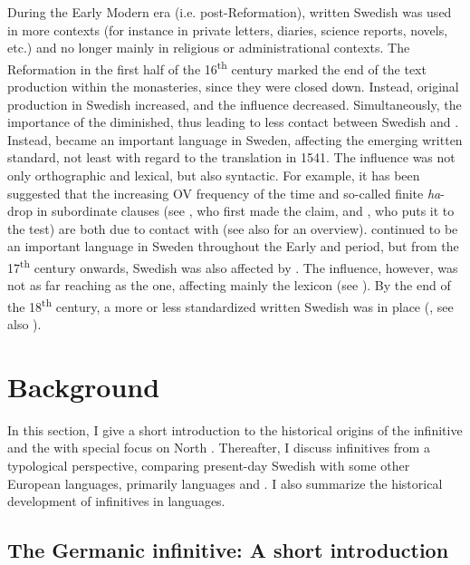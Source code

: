 \documentclass[output=paper]{langscibook}
\begin{document}
During the Early Modern era (i.e. post-Reformation), written Swedish was used in more contexts (for instance in private letters, diaries, science reports, novels, etc.) and no longer mainly in religious or administrational contexts. The Reformation in the first half of the 16\textsuperscript{th} century marked the end of the text production within the monasteries, since they were closed down. Instead, original production in Swedish increased, and the  influence decreased. Simultaneously, the importance of the  diminished, thus leading to less contact between Swedish and . Instead,  became an important language in Sweden, affecting the emerging written standard, not least with regard to the  translation in 1541. The  influence was not only orthographic and lexical, but also syntactic. For example, it has been suggested that the increasing OV frequency of the time \citep{Petzell2011} and so-called finite \textit{ha}{}-drop in subordinate clauses (see \citealt{Johannisson1945}, who first made the claim, and \citealt{Backstrom2019}, who puts it to the test) are both due to contact with  (see also \citealt{Braunmuller2005} for an overview).  continued to be an important language in Sweden throughout the Early and  period, but from the 17\textsuperscript{th} century onwards, Swedish was also affected by . The  influence, however, was not as far reaching as the  one, affecting mainly the lexicon (see \citealt{Gellerstam2005}). By the end of the 18\textsuperscript{th} century, a more or less standardized written Swedish was in place (\citealt{Teleman2002}, see also ).


\section{Background}\label{sec:kalm:3}


In this section, I give a short introduction to the historical origins of the infinitive and the  with special focus on North . Thereafter, I discuss  infinitives from a typological perspective, comparing present-day Swedish with some other European languages, primarily  languages and . I also summarize the historical development of  infinitives in  languages. 


\subsection{The Germanic infinitive: A short introduction}\label{sec:kalm:3.1}
\end{document}
